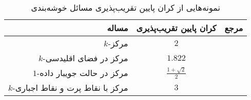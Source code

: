 \begin{table}[h]
\centering
\caption{نمونه‌هایی از کران پایین تقریب‌پذیری مسائل خوشه‌بندی}
\label{tab:approx}
\begin{tabular}{rcl}
\toprule
مساله & کران پایین تقریب‌پذیری & مرجع \\
\midrule
$k$-مرکز &
$2$ & \cite{vazirani2013approximation} \\ 
$k$-مرکز در فضای اقلیدسی &
$1.822$ & \cite{bern1996approximation} \\
$1$-مرکز در حالت جویبار داده & $\frac{1 + \sqrt{2}}{2}$ & \cite{agarwal2010streaming} \\
$k$-مرکز با نقاط پرت و نقاط اجباری &
$3$ & \cite{charikar2001algorithms} \\
\bottomrule
\end{tabular}
\end{table}
